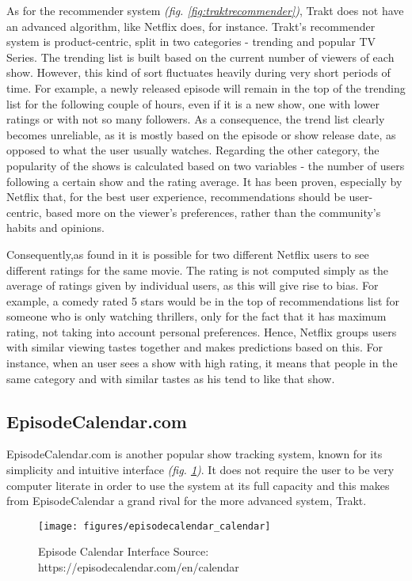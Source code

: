 As for the recommender system \textit{(fig. \ref{fig:traktrecommender})}, Trakt does not have an advanced algorithm, like Netflix does, for instance. Trakt's recommender system is product-centric, split in two categories - trending and popular TV Series. The trending list is built based on the current number of viewers of each show. However, this kind of sort fluctuates heavily during very short periods of time. For example, a newly released episode will remain in the top of the trending list for the following couple of hours, even if it is a new show, one with lower ratings or with not so many followers. As a consequence, the trend list clearly becomes unreliable, as it is mostly based on the episode or show release date, as opposed to what the user usually watches. Regarding the other category, the popularity of the shows is calculated based on two variables - the number of users following a certain show and the rating average. It has been proven, especially by Netflix that, for the best user experience, recommendations should be user-centric, based more on the viewer's preferences, rather than the community's habits and opinions.

Consequently,as found in \cite{Netflix} it is possible for two different Netflix users to see different ratings for the same movie. The rating is not computed simply as the average of ratings given by individual users, as this will give rise to bias. For example, a comedy rated 5 stars would be in the top of recommendations list for someone who is only watching thrillers, only for the fact that it has maximum rating, not taking into account personal preferences. Hence, Netflix groups users with similar viewing tastes together and makes predictions based on this. For instance, when an user sees a show with high rating, it means that people in the same category and with similar tastes as his tend to like that show. 


\subsection{EpisodeCalendar.com}

EpisodeCalendar.com \cite{5} is another popular show tracking system, known for its simplicity and intuitive interface \textit{(fig. \ref{fig:episodecalendarcalendar})}. It does not require the user to be very computer literate in order to use the system at its full capacity and this makes from EpisodeCalendar a grand rival for the more advanced system, Trakt.

\begin{figure}[h]
\centering
\texttt{[image: figures/episodecalendar\_calendar]}
\caption{Episode Calendar Interface \newline Source: https://episodecalendar.com/en/calendar}
\label{fig:episodecalendarcalendar}
\end{figure}

